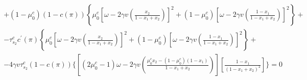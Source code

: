\documentclass[12pt,a4paper]{article}
\newcommand{\RomanNumeralCaps}[1]{\MakeUppercase{\romannumeral #1}}
\newtheorem{proposition}{Proposition}
\begin{document}
\begin{small}
\begin{eqnarray}
\begin{split}
        +(1-\mu_0^c)(1-c(\pi))\left\{\mu_0^c\left[\omega-2\gamma v\left(\frac{x_2}{1-x_1+x_2}\right)\right]^2+(1-\mu_0^c)\left[\omega-2\gamma v\left(\frac{1-x_1}{1-x_1+x_2}\right)\right]^2\right\}+\\
        -\tau_{s_2}^cc^\prime(\pi)\left\{\mu_0^c\left[\omega-2\gamma v\left(\frac{x_2}{1-x_1+x_2}\right)\right]^2+(1-\mu_0^c)\left[\omega-2\gamma v\left(\frac{1-x_1}{1-x_1+x_2}\right)\right]^2\right\}+\\
        -4\gamma v\tau_{s_2}^c(1-c(\pi))\Bigg\{\left[(2\mu_0^c-1)\omega-2\gamma v\left(\frac{\mu_0^cx_2-(1-\mu_0^c)(1-x_1)}{1-x_1+x_2}\right)\right]\left[\frac{1-x_1}{(1-x_1+x_2)^2}\right]\Bigg\}=0
    \end{split}
\end{eqnarray}
\end{small}
\end{document}
